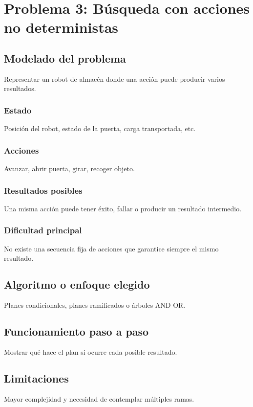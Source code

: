 \section{Problema 3: Búsqueda con acciones no deterministas}

\subsection{Modelado del problema}
Representar un robot de almacén donde una acción puede producir varios resultados.

\subsubsection{Estado}
Posición del robot, estado de la puerta, carga transportada, etc.

\subsubsection{Acciones}
Avanzar, abrir puerta, girar, recoger objeto.

\subsubsection{Resultados posibles}
Una misma acción puede tener éxito, fallar o producir un resultado intermedio.

\subsubsection{Dificultad principal}
No existe una secuencia fija de acciones que garantice siempre el mismo resultado.

\subsection{Algoritmo o enfoque elegido}
Planes condicionales, planes ramificados o árboles AND-OR.

\subsection{Funcionamiento paso a paso}
Mostrar qué hace el plan si ocurre cada posible resultado.

\subsection{Limitaciones}
Mayor complejidad y necesidad de contemplar múltiples ramas.
